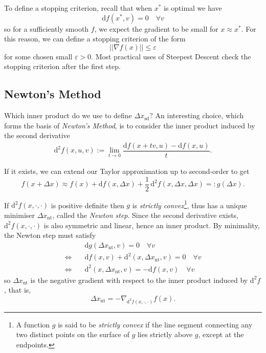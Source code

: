 \documentclass[a4paper,11pt]{article}
\begin{document}
\newpage

To define a stopping criterion, recall that when $x^*$ is optimal we have $$\text{d}f(x^*,v)=0 \quad \forall v$$ so for a sufficiently smooth $f$, we expect the gradient to be small for $x\approx x^*$. For this reason, we can define a stopping criterion of the form $$||\nabla f(x)|| \leqslant \varepsilon$$ for some chosen small $\varepsilon >0$. Most practical uses of Steepest Descent check the stopping criterion after the first step.

\subsection{Newton's Method}

Which inner product do we use to define $\Delta x_{\text{sd}}$? An interesting choice, which forms the basis of \textit{Newton's Method}, is to consider the inner product induced by the second derivative \begin{align*}\text{d}^2f(x,u,v):=\lim_{t\rightarrow 0}\dfrac{\text{d}f(x+tv,u)-\text{d}f(x,u)}{t}.\end{align*}

If it exists, we can extend our Taylor approximation up to second-order to get $$f(x+\Delta x)\approx f(x) +\text{d}f(x,\Delta x)+\frac{1}{2}\,\text{d}^2 f(x, \Delta x, \Delta x)=:g(\Delta x).$$ 

If $\text{d}^2f(x,\cdot,\cdot)$ is positive definite then $g$ is \textit{strictly convex}\footnote{A function $g$ is said to be \textit{strictly convex} if the line segment connecting any two distinct points on the surface of $g$ lies strictly above $g$, except at the endpoints.}, thus has a unique minimiser $\Delta x_{\text{nt}}$, called the \textit{Newton step}. Since the second derivative exists, $\text{d}^2f(x,\cdot,\cdot)$ is also symmetric and linear, hence an inner product. By minimality, the Newton step must satisfy
\begin{align*}
    &\text{d}g(\Delta x_{\text{nt}},v)=0\quad \forall v \\ \Longleftrightarrow \quad & \text{d}f(x,v)+\text{d}^2(x,\Delta x_{\text{nt}},v)=0 \quad \forall v \\ \Longleftrightarrow \quad & \text{d}^2(x,\Delta x_{\text{nt}},v)=-\text{d}f(x,v) \quad \forall v
\end{align*}
so $\Delta x_{\text{nt}}$ is the negative gradient with respect to the inner product induced by $\text{d}^2f$, that is,
$$\Delta x_{\text{nt}}=-\nabla_{\text{d}^2f(x,\cdot,\cdot)}f(x).$$
\end{document}

